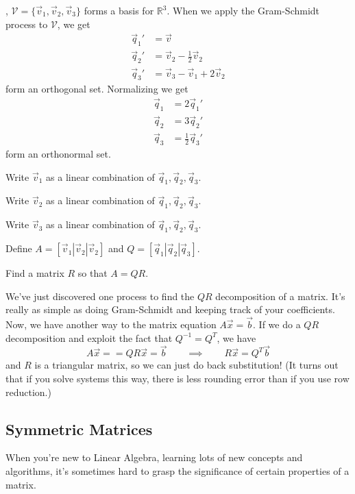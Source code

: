 \documentclass{article}
\newcommand{\R}{\mathbb{R}}
\begin{document}
	\sep
	$\mathcal V=\{\vec v_1,\vec v_2,\vec v_3\}$ forms a basis for $\R^3$.
	When we apply the Gram-Schmidt process to $\mathcal V$, we get
	\[
		\begin{array}{rl}
			\vec q_1' &=\vec v\\
			\vec q_2' &= \vec v_2-\frac{1}{2}\vec v_2\\
			\vec q_3' &= \vec v_3-\vec v_1+2\vec v_2
		\end{array}
	\]
	form an orthogonal set.  Normalizing we get
	\[
		\begin{array}{rl}
			\vec q_1 &= 2\vec q_1'\\
			\vec q_2 &= 3\vec q_2'\\
			\vec q_3 &=\frac{1}{2}\vec q_3'
		\end{array}
	\]
	form an orthonormal set.
	\begin{Enum}
		\item Write $\vec v_1$ as a linear combination of $\vec q_1,\vec q_2,\vec q_3$.
		\item Write $\vec v_2$ as a linear combination of $\vec q_1,\vec q_2,\vec q_3$.
		\item Write $\vec v_3$ as a linear combination of $\vec q_1,\vec q_2,\vec q_3$.
	\end{Enum}
	Define $A=[\vec v_1|\vec v_2|\vec v_2]$ and $Q=[\vec q_1|\vec q_2|\vec q_3]$.
	\begin{Enum}[resume]
		\item Find a matrix $R$ so that $A=QR$.
	\end{Enum}
	
	We've just discovered one process to find the $QR$ decomposition of a matrix.
	It's really as simple as doing Gram-Schmidt and keeping track of your coefficients.
	Now, we have another way to the matrix equation $A\vec x=\vec b$.  If we do a $QR$
	decomposition and exploit the fact that $Q^{-1}=Q^T$, we have
	\[
		A\vec x==QR\vec x=\vec b\qquad\implies\qquad R\vec x=Q^T\vec b
	\]
	and $R$ is a triangular matrix, so we can just do back substitution! (It turns
	out that if you solve systems this way, there is less rounding error than if you
	use row reduction.)

\subsection*{Symmetric Matrices}
	When you're new to Linear Algebra, learning lots of new concepts and algorithms,
	it's sometimes hard to grasp the significance of certain properties of a matrix.
\end{document}
